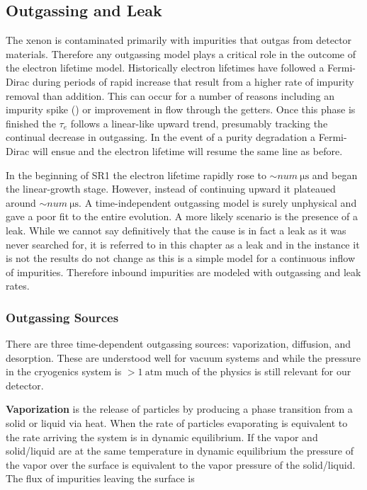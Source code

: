 \subsection{Outgassing and Leak}
\label{subsec:electron_lifetime_model_outgassing}
The xenon is contaminated primarily with impurities that outgas from detector materials.  Therefore any outgassing model plays a
critical role in the outcome of the electron lifetime model.  Historically electron lifetimes have followed a Fermi-Dirac during periods
of rapid increase that result from a higher rate of impurity
removal than addition.  This can occur for a number of reasons including an impurity spike
() or improvement in flow through the getters.  Once this phase is
finished the $\tau_e$ follows a linear-like upward trend, presumably tracking the continual decrease in outgassing.  In the event of a
purity degradation a Fermi-Dirac will ensue and the electron lifetime will resume the same line as before.

In the beginning of SR1 the electron lifetime rapidly rose to ${\sim} num\ \mathrm{\mu s}$ and began the linear-growth stage.  However,
instead
of continuing upward it plateaued around ${\sim} num\ \mathrm{\mu s}$.  A time-independent outgassing model is surely unphysical and
gave a poor fit to the entire evolution.  A more likely scenario is the presence of a leak.  While we cannot say definitively that the
cause is in fact a leak as it was never searched for, it is referred to in this chapter as a leak and in the instance it is not the
results do not change as this is a simple model for a continuous inflow of impurities.  Therefore inbound impurities are modeled with
outgassing and leak rates.



\subsubsection{Outgassing Sources}
\label{subsubsec:electron_lifetime_model_outgassing_sources}
There are three time-dependent outgassing sources: vaporization, diffusion, and desorption.  These are understood well for vacuum systems
and while the pressure in the cryogenics system is $> 1\ \mathrm{atm}$ much of the physics is still relevant for our detector.

\textbf{Vaporization} is the release of particles by producing a phase transition from a solid or liquid via heat.  When the rate of
particles evaporating is equivalent to the rate arriving the system is in dynamic equilibrium.  If the vapor and solid/liquid are at the
same temperature in dynamic equilibrium the pressure of the vapor over the surface is equivalent to the vapor pressure of the
solid/liquid.  The flux of impurities leaving the surface is

